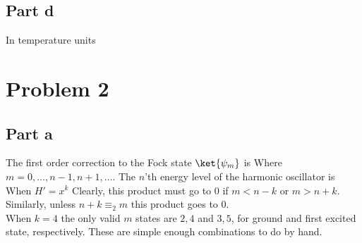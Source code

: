 \subsection*{Part d}
In temperature units
\newpage
\section*{Problem 2}
\subsection*{Part a}
The first order correction to the Fock state $\ket{\psi_m}$ is
Where $m=0,\dots,n-1,n+1,\dots$.
The $n$'th energy level of the harmonic oscillator is
When $H' = x^k$
Clearly, this product must go to $0$ if $m < n - k$ or $m > n + k$. Similarly, unless $n+k \equiv_2 m$ this product goes to $0$.\\


When $k=4$ the only valid $m$ states are $2,4$ and $3,5$, for ground and first excited state, respectively. These are simple enough combinations to do by hand.

